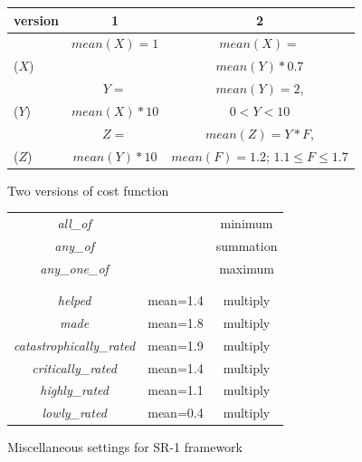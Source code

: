 \documentclass[twocolumn]{styles/IEEEtran}
\begin{document}
\begin{figure}[h]
\begin{center}
\begin{footnotesize}
 \begin{tabular}[t]{|l|c|c|} \hline
version 			& 1		& 2	\\ \hline
{\verb1<notHigh>1}	& $mean(X)=1$		& $mean(X)=$\\
($X$)		&			& $mean(Y)*0.7$	\\ \hline
{\verb1<high>1} 	& $Y=$			& $mean(Y)=2$, \\
($Y$)		& $mean(X)*10$		& $0<Y<10$\\ \hline
{\verb1<veryHigh>1}	&$Z=$		&$mean(Z)=Y*F$, \\
($Z$)		&$mean(Y)*10$	&$mean(F)=1.2$; $1.1\leq F \leq 1.7$ \\ \hline
 \end{tabular}
\end{footnotesize}
\end{center}
 \caption{Two versions of cost function}
\label{fig:cara_analysis_cost}
\end{figure} 

\begin{figure}[h]
\begin{center}
\begin{footnotesize}
 \begin{tabular}[t]{|c|c|c|} \hline
 {\verb1<combine_logic>1}		& {\verb1<op>1} 		& {\verb1<arithmetic[op]>1}\\ \hline
 {\sl all\_of}			& {\verb1rand1}		& minimum \\
 {\sl any\_of}			& {\verb1rany1}		& summation \\
 {\sl any\_one\_of}			& {\verb1ror1}		& maximum \\ \hline
 {\verb1<contribution>1}		& {\verb1<value>1} 	& {\verb1<arithmetic>1}\\ 
 				& {\verb1[contribution]1}	& {\verb1[contribution]1}\\ \hline
 {\sl helped}			& mean=1.4		& multiply \\
 {\sl made}			& mean=1.8		& multiply \\
 {\sl catastrophically\_rated}		& mean=1.9		& multiply \\
 {\sl critically\_rated}			& mean=1.4		& multiply \\
 {\sl highly\_rated}			& mean=1.1		& multiply \\
 {\sl lowly\_rated}			& mean=0.4		& multiply \\ \hline
 \end{tabular}
\end{footnotesize}
\end{center}
 \caption{Miscellaneous settings for SR-1 framework}
\label{fig:cara_analysis_config}
\end{figure} 
\end{document}

